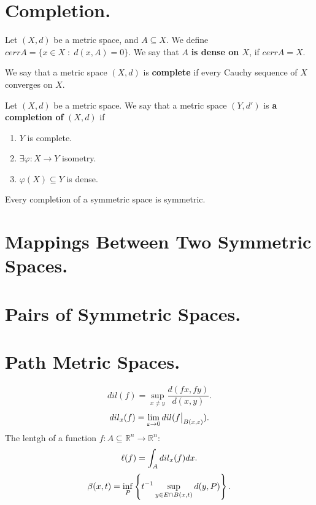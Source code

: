 \documentclass{amsart}
\begin{document}
\section{Completion.} %
\begin{definition}
	Let \((X,d)\) be a metric space, and \(A \subseteq X\).
	We define \(cerrA = \{x \in X \;:\; d(x,A) =0\}\).
	We say that \(A\) \textbf{is dense on \(X\)}, if \(cerrA = X\).
\end{definition}
\begin{definition}
	We say that a metric space \((X,d)\) is \textbf{complete} if every Cauchy sequence of \(X\) converges on \(X\).
\end{definition}
\begin{definition}
	Let \((X,d)\) be a metric space.
	We say that a metric space \((Y,d')\) is \textbf{a completion of} \((X,d)\) if 
	\begin{enumerate}
		\item \(Y\) is complete.
		\item \(\exists \varphi :X \longrightarrow Y\) isometry.
		\item \(\varphi (X) \subseteq Y\) is dense.
	\end{enumerate}
\end{definition}
\begin{theorem}
	Every completion of a symmetric space is symmetric.
\end{theorem}

\section{Mappings Between Two Symmetric Spaces.} %

\section{Pairs of Symmetric Spaces.} %

\section{Path Metric Spaces.} %
\[
	dil(f) = \sup _{x \ne y} \dfrac{d(fx,fy)}{d(x,y)}.
\]
\[
	dil_x(f) = \displaystyle\lim_{\varepsilon\rightarrow 0} dil(f \big| _{B(x, \varepsilon)}).
\]
The lentgh of a function \(f:A \subseteq \mathbb{R}^n \longrightarrow \mathbb{R} ^n\):
\[
	\ell (f) = \displaystyle\int _A dil_x(f) dx.
\]
\[
	\beta (x,t) = \displaystyle \inf _P \left\{t^{-1} \displaystyle \sup _{y \in E \cap B(x,t)} d(y,P)\right\}.
\]



\end{document}
